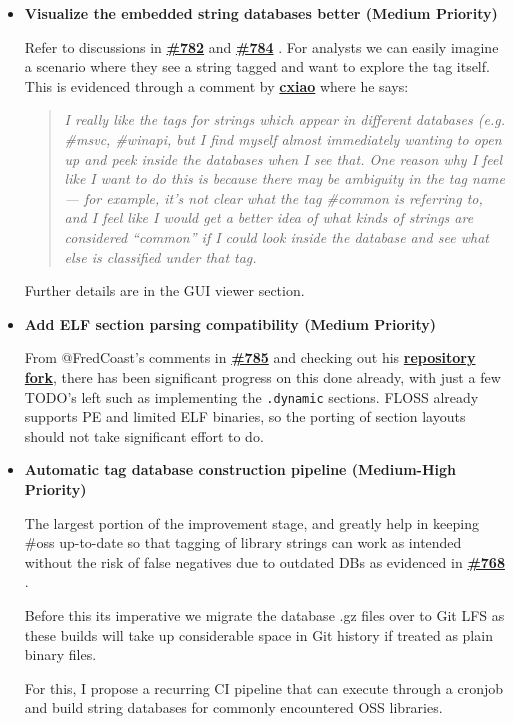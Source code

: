 \documentclass[12pt]{article}
\newcommand{\issue}[1]{%
    \href{https://github.com/mandiant/flare-floss/issues/#1}{\textbf{\##1}}%
}
\begin{document}
\begin{itemize}
    \item \textbf{Visualize the embedded string databases better (Medium Priority)}

    Refer to discussions in \issue{782} and \issue{784}. For analysts we can easily imagine a scenario where they see a string tagged and want to explore the tag itself. This is evidenced through a comment by \href{https://github.com/cxiao}{\textbf{cxiao}} where he says:

    \begin{quote}
        \textit{I really like the tags for strings which appear in different databases (e.g. \#msvc, \#winapi, but I find myself almost immediately wanting to open up and peek inside the databases when I see that. One reason why I feel like I want to do this is because there may be ambiguity in the tag name — for example, it's not clear what the tag \#common is referring to, and I feel like I would get a better idea of what kinds of strings are considered ``common'' if I could look inside the database and see what else is classified under that tag.}
    \end{quote}
    Further details are in the GUI viewer section.

    \item \textbf{Add ELF section parsing compatibility (Medium Priority)}

    From @FredCoast's comments in \issue{785} and checking out his \href{https://github.com/FredCoast/flare-floss/commits/elf/}{\textbf{repository fork}}, there has been significant progress on this done already, with just a few TODO's left such as implementing the \texttt{.dynamic} sections. FLOSS already supports PE and limited ELF binaries, so the porting of section layouts should not take significant effort to do.

    \item \textbf{Automatic tag database construction pipeline (Medium-High Priority)}

    The largest portion of the improvement stage, and greatly help in keeping \#oss up-to-date so that tagging of library strings can work as intended without the risk of false negatives due to outdated DBs as evidenced in \issue{768}.

    Before this its imperative we migrate the database .gz files over to Git LFS as these builds will take up considerable space in Git history if treated as plain binary files.

    For this, I propose a recurring CI pipeline that can execute through a cronjob and build string databases for commonly encountered OSS libraries.


\end{itemize}
\end{document}
